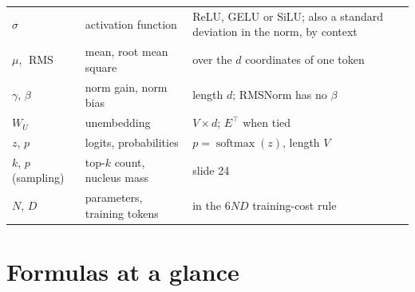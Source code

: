 \documentclass[11pt,letterpaper]{article}
\DeclareMathOperator{\softmax}{softmax}
\DeclareMathOperator{\RMS}{RMS}
\begin{document}
\begin{center}
\begin{tabular}{@{}lp{3.6cm}p{7.4cm}@{}}
$\sigma$ & activation function & ReLU, GELU or SiLU; also a standard deviation in the norm, by context\\
$\mu$, $\RMS$ & mean, root mean square & over the $d$ coordinates of one token\\
$\gamma$, $\beta$ & norm gain, norm bias & length $d$; RMSNorm has no $\beta$\\
$W_U$ & unembedding & $V\times d$; $E^{\top}$ when tied\\
$z$, $p$ & logits, probabilities & $p=\softmax(z)$, length $V$\\
$k$, $p$ (sampling) & top-$k$ count, nucleus mass & slide 24\\
$N$, $D$ & parameters, training tokens & in the $6ND$ training-cost rule\\
\bottomrule
\end{tabular}
\end{center}

\clearpage
\section{Formulas at a glance}
\end{document}
